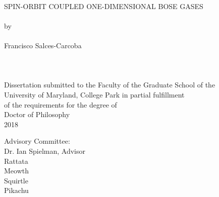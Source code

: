 
\thispagestyle{empty}
\hbox{\ }
\vspace{1in}
\renewcommand{\baselinestretch}{1}
\small\normalsize
\begin{center}

\large{{SPIN-ORBIT COUPLED ONE-DIMENSIONAL BOSE GASES}}
\ \\
\ \\
\large{by} \\
\ \\
\large{Francisco Salces-Carcoba}%
\ \\
\ \\
\ \\
\ \\
\normalsize
Dissertation submitted to the Faculty of the Graduate School of the \\
University of Maryland, College Park in partial fulfillment \\
of the requirements for the degree of \\
Doctor of Philosophy \\
2018
\end{center}

\vspace{7.5em}

\noindent Advisory Committee: \\
Dr. Ian Spielman, Advisor \\
Rattata \\
Meowth \\
Squirtle \\
Pikachu
